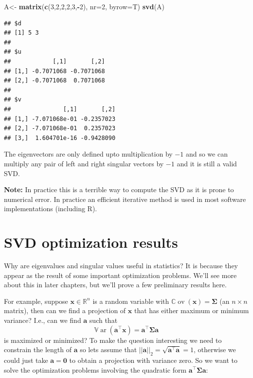 \documentclass[
]{book}
\newenvironment{Shaded}{\begin{snugshade}}{\end{snugshade}}
\newcommand{\AttributeTok}[1]{\textcolor[rgb]{0.13,0.29,0.53}{#1}}
\newcommand{\DecValTok}[1]{\textcolor[rgb]{0.00,0.00,0.81}{#1}}
\newcommand{\FunctionTok}[1]{\textcolor[rgb]{0.13,0.29,0.53}{\textbf{#1}}}
\newcommand{\NormalTok}[1]{#1}
\newcommand{\OtherTok}[1]{\textcolor[rgb]{0.56,0.35,0.01}{#1}}
\newcommand{\SpecialCharTok}[1]{\textcolor[rgb]{0.81,0.36,0.00}{\textbf{#1}}}
\theoremstyle{definition}
\theoremstyle{definition}
\theoremstyle{definition}
\theoremstyle{definition}
\theoremstyle{remark}
\begin{document}
\begin{Shaded}
\begin{Highlighting}[]
\NormalTok{A}\OtherTok{\textless{}{-}} \FunctionTok{matrix}\NormalTok{(}\FunctionTok{c}\NormalTok{(}\DecValTok{3}\NormalTok{,}\DecValTok{2}\NormalTok{,}\DecValTok{2}\NormalTok{,}\DecValTok{2}\NormalTok{,}\DecValTok{3}\NormalTok{,}\SpecialCharTok{{-}}\DecValTok{2}\NormalTok{), }\AttributeTok{nr=}\DecValTok{2}\NormalTok{, }\AttributeTok{byrow=}\NormalTok{T)}
\FunctionTok{svd}\NormalTok{(A)}
\end{Highlighting}
\end{Shaded}

\begin{verbatim}
## $d
## [1] 5 3
## 
## $u
##            [,1]       [,2]
## [1,] -0.7071068 -0.7071068
## [2,] -0.7071068  0.7071068
## 
## $v
##               [,1]       [,2]
## [1,] -7.071068e-01 -0.2357023
## [2,] -7.071068e-01  0.2357023
## [3,]  1.604701e-16 -0.9428090
\end{verbatim}

The eigenvectors are only defined upto multiplication by \(-1\) and so we can multiply any pair of left and right singular vectors by \(-1\) and it is still a valid SVD.

\textbf{Note:} In practice this is a terrible way to compute the SVD as it is prone to numerical error. In practice an efficient iterative method is used in most software implementations (including R).

\section{SVD optimization results}\label{svdopt}

Why are eigenvalues and singular values useful in statistics? It is because they appear as the result of some important optimization problems. We'll see more about this in later chapters, but we'll prove a few preliminary results here.

For example, suppose \(\mathbf x\in\mathbb{R}^n\) is a random variable with \({\mathbb{C}\operatorname{ov}}(\mathbf x)=\boldsymbol{\Sigma}\) (an \(n \times n\) matrix), then can we find a projection of \(\mathbf x\) that has either maximum or minimum variance? I.e., can we find \(\mathbf a\) such that \[{\mathbb{V}\operatorname{ar}}(\mathbf a^\top\mathbf x)=\mathbf a^\top \boldsymbol{\Sigma}\mathbf a\] is maximized or minimized?
To make the question interesting we need to constrain the length of \(\mathbf a\) so lets assume that \(||\mathbf a||_2 = \sqrt{\mathbf a^\top \mathbf a}=1\), otherwise we could just take \(\mathbf a={\boldsymbol 0}\) to obtain a projection with variance zero. So we want to solve the optimization problems involving the quadratic form \(\mathbf a^\top \boldsymbol{\Sigma}\mathbf a\):
\end{document}
